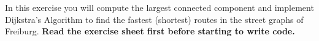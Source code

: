 In this exercise you will compute the largest connected component and implement Dijkstra's Algorithm to find the fastest (shortest) routes in the street graphs of Freiburg.
\textbf{Read the exercise sheet first before starting to write code.}